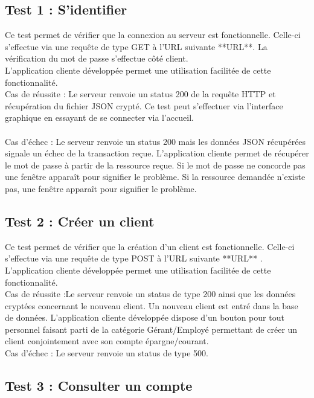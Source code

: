 \subsection{Test 1 : S'identifier}

Ce test permet de vérifier que la connexion au serveur est fonctionnelle.
Celle-ci s'effectue via une requête de type GET à l'URL suivante **URL**.
La vérification du mot de passe s'effectue côté client. 
\\
L'application cliente développée permet une utilisation facilitée de cette fonctionnalité. 
\\
Cas de réussite : Le serveur renvoie un status 200 de la requête HTTP et récupération du fichier JSON crypté. Ce test peut s'effectuer via l'interface graphique en essayant de se connecter via l'accueil.\\
\\
Cas d'échec : Le serveur renvoie un status 200 mais les données JSON récupérées signale un échec de la transaction reçue.
L'application cliente permet de récupérer le mot de passe à partir de la ressource reçue. Si le mot de passe ne concorde pas une fenêtre apparaît pour signifier le problème.
Si la ressource demandée n'existe pas,  une fenêtre apparaît pour signifier le problème.

\subsection{Test 2 : Créer un client}

Ce test permet de vérifier que la création d'un client est fonctionnelle.
Celle-ci s'effectue via une requête de type POST à l'URL suivante **URL** .
\\
L'application cliente développée permet une utilisation facilitée de cette fonctionnalité. 
\\
Cas de réussite :Le serveur renvoie un status de type 200 ainsi que les données cryptées concernant le nouveau client. Un nouveau client est entré dans la base de données.
L'application cliente développée dispose d'un bouton pour tout personnel faisant parti de la catégorie Gérant/Employé permettant de créer un client conjointement avec son compte épargne/courant.
\\
Cas d'échec : Le serveur renvoie un status de type 500.

\subsection{Test 3 : Consulter un compte}

